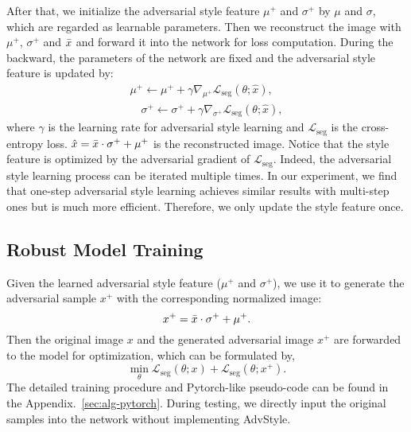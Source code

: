 \documentclass{article}
\newcommand{\ours}{AdvStyle\xspace}
\begin{document}
After that, we initialize the adversarial style feature $\mu^{+}$ and $\sigma^{+}$ by $\mu$ and $\sigma$, which are regarded as learnable parameters. Then we reconstruct the image with $\mu^{+}$, $\sigma^{+}$ and $\Bar{x}$ and forward it into the network for loss computation. During the backward, the parameters of the network are fixed and the adversarial style feature is updated by:
\begin{equation}
\label{eq:style_update}
\begin{aligned}
\mu^{+} \leftarrow \mu^{+}+\gamma \nabla_{\mu^{+}} \mathcal{L}_{\text{seg}}\left(\theta; \hat{x} \right), \\ \hspace{1em}
\sigma^{+} \leftarrow \sigma^{+}+\gamma \nabla_{\sigma^{+}} \mathcal{L}_{\text{seg}}\left(\theta; \hat{x}\right),
\end{aligned}
\end{equation}
where $\gamma$ is the learning rate for adversarial style learning and $\mathcal{L}_{\text{seg}}$ is the cross-entropy loss. $\hat{x}=\Bar{x} \cdot \sigma^{+} + \mu^{+}$ is the reconstructed image. Notice that the style feature is optimized by the adversarial gradient of $\mathcal{L}_{\text{seg}}$. Indeed, the adversarial style learning process can be iterated multiple times.
In our experiment, we find that one-step adversarial style learning achieves similar results with multi-step ones but is much more efficient. Therefore, we only update the style feature once.

\subsection{Robust Model Training}

Given the learned adversarial style feature ($\mu^{+}$ and $\sigma^{+}$), we use it to generate the adversarial sample $x^{+}$ with the corresponding normalized image:
\begin{equation}
\label{eq:denorm}
    x^{+} = \Bar{x} \cdot \sigma^{+} + \mu^{+}.
\end{equation}
Then the original image $x$ and the generated adversarial image $x^{+}$ are forwarded to the model for optimization, which can be formulated by,
\begin{equation}
\label{eq:final-loss}
\min _{\theta} \mathcal{L}_{\text{seg}}(\theta ; x) + \mathcal{L}_{\text{seg}}(\theta ; x^{+}).
\end{equation}
The detailed training procedure and Pytorch-like pseudo-code can be found in the Appendix.~\ref{sec:alg-pytorch}. During testing, we directly input the original samples into the network without implementing \ours.
\end{document}
